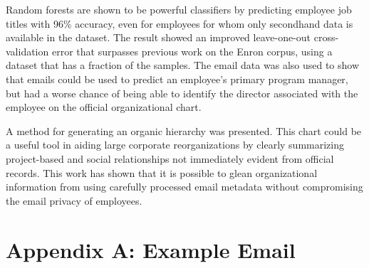 \documentclass[12pt]{report}
\begin{document}
Random forests are shown to be powerful classifiers by predicting employee job titles with 96\% accuracy, even for employees for whom only secondhand data is available in the dataset.
The result showed an improved leave-one-out cross-validation error that surpasses previous work on the Enron corpus, using a dataset that has a fraction of the samples.
The email data was also used to show that emails could be used to predict an employee's primary program manager, but had a worse chance of being able to identify the director associated with the employee on the official organizational chart.

A method for generating an organic hierarchy was presented.
This chart could be a useful tool in aiding large corporate reorganizations by clearly summarizing project-based and social relationships not immediately evident from official records.
This work has shown that it is possible to glean organizational information from using carefully processed email metadata without compromising the email privacy of employees.


%
%

%






\appendix

\chapter*{Appendix A: Example Email}

\end{document}
